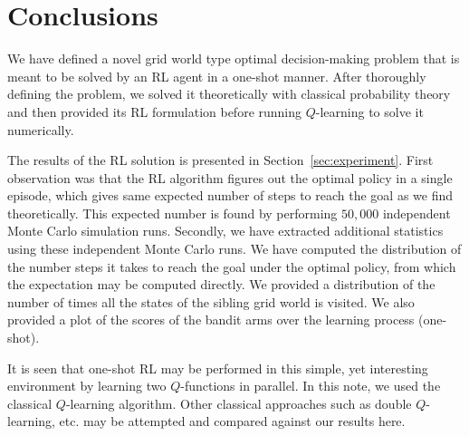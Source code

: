 \section{Conclusions}
\label{sec:conclusion}
%
We have defined a novel grid world type optimal decision-making problem that is
meant to be solved by an RL agent in a one-shot manner. After thoroughly
defining the problem, we solved it theoretically with classical probability 
theory and then provided its RL formulation before running $Q$-learning to solve
it numerically.

The results of the RL solution is presented in Section~\ref{sec:experiment}. 
First observation was that the RL algorithm figures out the optimal policy in a
single episode, which gives same expected number of steps to reach the goal as
we find theoretically. This expected number is found by performing $50,000$
independent Monte Carlo simulation runs. Secondly, we have extracted additional 
statistics using these independent Monte Carlo runs. We have computed the 
distribution of the number steps it takes to reach the goal under the optimal 
policy, from which the expectation may be computed directly. We provided a 
distribution of the number of times all the states of the sibling grid world 
is visited. We also provided a plot of the scores of the bandit arms over the 
learning process (one-shot).

It is seen that one-shot RL may be performed in this simple, yet interesting
environment by learning two $Q$-functions in parallel. In this note, we used the
classical $Q$-learning algorithm. Other classical approaches such as double
$Q$-learning, etc. may be attempted and compared against our results here.